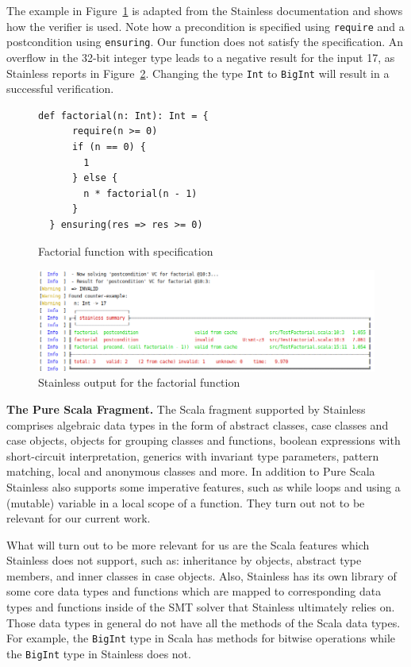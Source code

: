 \documentclass[hyphens, a4paper,USenglish,cleveref, autoref, thm-restate]{oasics-v2019}
\renewcommand{\paragraph}{\textbf}%
\begin{document}
The example in Figure~\ref{fig:factorial} is adapted from the Stainless
documentation \cite{Stainless:documentation} and shows how the verifier is
used. Note how a precondition is specified using \texttt{require} and
a postcondition using \texttt{ensuring}. Our function does not satisfy
the specification. An overflow in the 32-bit integer type leads to a
negative result for the input 17, as Stainless reports in
Figure~\ref{fig:failed}. Changing the type \texttt{Int} to
\texttt{BigInt} will result in a successful verification.


\begin{figure}
\begin{lstlisting}[style=scala]
  def factorial(n: Int): Int = {
      require(n >= 0)
      if (n == 0) {
        1
      } else {
        n * factorial(n - 1)
      }
  } ensuring(res => res >= 0)
\end{lstlisting}
	\caption{Factorial function with specification}
	\label{fig:factorial}
\end{figure}

\begin{figure}
	\centering
		\includegraphics[width=\textwidth]{output1.png}
	\caption{Stainless output for the factorial function}
	\label{fig:failed}
\end{figure}


\paragraph{The Pure Scala Fragment.} The Scala fragment supported by
Stainless comprises algebraic data types in the form of abstract
classes, case classes and case objects, objects for grouping classes
and functions, boolean expressions with short-circuit interpretation,
generics with invariant type parameters, pattern matching, local and
anonymous classes and more.  In addition to Pure Scala Stainless also
supports some imperative features, such as while loops and using a
(mutable) variable in a local scope of a function. They turn out not
to be relevant for our current work.

What will turn out to be more relevant for us are the Scala features
which Stainless does not support, such as: inheritance by objects,
abstract type members, and inner classes in case objects. Also,
Stainless has its own library of some core data types and functions
which are mapped to corresponding data types and functions inside of
the SMT solver that Stainless ultimately relies on. Those data types
in general do not have all the methods of the Scala data types. For
example, the \texttt{BigInt} type in Scala has methods for bitwise
operations while the \texttt{BigInt} type in Stainless does not.
\end{document}
